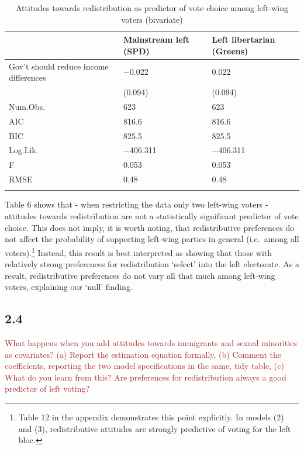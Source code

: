 \documentclass[
]{article}
\begin{document}
\begin{table}[!h]

\caption{\label{tab:left-wing-vot-comp}Attitudes towards redistribution as predictor of vote choice among left-wing voters (bivariate)}
\centering
\begin{tabu} to 
\toprule
  & Mainstream left (SPD) & Left libertarian (Greens)\\
\midrule
Gov't should reduce income differences & \num{-0.022} & \num{0.022}\\
 & (\num{0.094}) & (\num{0.094})\\
\midrule
Num.Obs. & \num{623} & \num{623}\\
AIC & \num{816.6} & \num{816.6}\\
BIC & \num{825.5} & \num{825.5}\\
Log.Lik. & \num{-406.311} & \num{-406.311}\\
F & \num{0.053} & \num{0.053}\\
RMSE & \num{0.48} & \num{0.48}\\
\bottomrule
{}\\
\end{tabu}
\end{table}

Table 6 shows that - when restricting the data only two left-wing voters
- attitudes towards redistribution are not a statistically significant
predictor of vote choice. This does not imply, it is worth noting, that
redistributive preferences do not affect the probability of supporting
left-wing parties in general (i.e.~among all voters).\footnote{Table 12
  in the appendix demonstrates this point explicitly. In models (2) and
  (3), redistributive attitudes are strongly predictive of voting for
  the left bloc.} Instead, this result is best interpreted as showing
that those with relatively strong preferences for redistribution
`select' into the left electorate. As a result, redistributive
preferences do not vary all that much among left-wing voters, explaining
our `null' finding.

\hypertarget{section-5}{%
\subsection{2.4}\label{section-5}}

\textcolor{brown}{What happens when you add attitudes towards immigrants and sexual minorities as covariates? (a) Report the estimation equation formally, (b) Comment the coefficients, reporting the two model specifications in the same, tidy table, (c) What do you learn from this? Are preferences for redistribution always a good predictor of left voting?}
\end{document}
